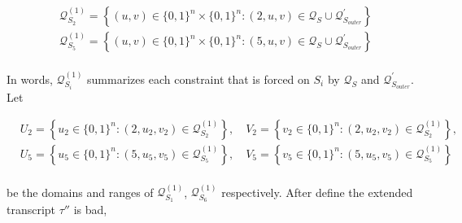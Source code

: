 $$
\begin{aligned}
&\mathcal{Q}_{S_{2}}^{(1)}=\left\{(u, v) \in\{0,1\}^{n} \times\{0,1\}^{n}:(2, u, v) \in \mathcal{Q}_{S} \cup \mathcal{Q}_{S_{outer}}^{\prime}\right\}\\
&\mathcal{Q}_{S_{5}}^{(1)}=\left\{(u, v) \in\{0,1\}^{n} \times\{0,1\}^{n}:(5, u, v) \in \mathcal{Q}_{S} \cup \mathcal{Q}_{S_{outer}}^{\prime}\right\}\\
\end{aligned}
$$

\noindent In words, $\mathcal{Q}_{S_{i}}^{(1)}$ summarizes each constraint that is forced on $S_{i}$ by $\mathcal{Q}_{S}$ and $\mathcal{Q}_{S_{outer}}^{\prime}$. Let

$$
\begin{aligned}
&U_{2}=\left\{u_{2} \in\{0,1\}^{n}:\left(2, u_{2}, v_{2}\right) \in \mathcal{Q}_{S_{2}}^{(1)}\right\}, \quad V_{2}=\left\{v_{2} \in\{0,1\}^{n}:\left(2, u_{2}, v_{2}\right) \in \mathcal{Q}_{S_{2}}^{(1)}\right\},\\
&U_{5}=\left\{u_{5} \in\{0,1\}^{n}:\left(5, u_{5}, v_{5}\right) \in \mathcal{Q}_{S_{5}}^{(1)}\right\}, \quad V_{5}=\left\{v_{5} \in\{0,1\}^{n}:\left(5, u_{5}, v_{5}\right) \in \mathcal{Q}_{S_{5}}^{(1)}\right\}\\
\end{aligned}
$$

\noindent be the domains and ranges of $\mathcal{Q}_{S_{1}}^{(1)}$, $\mathcal{Q}_{S_{6}}^{(1)}$ respectively. After define the extended transcript $\tau''$ is bad, \\

